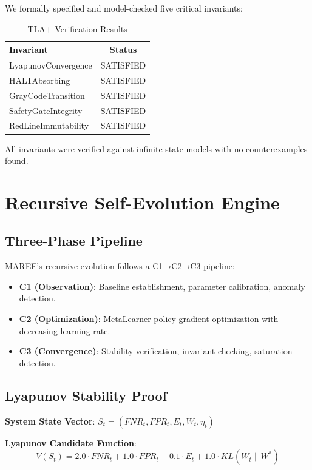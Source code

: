 \documentclass[11pt,a4paper]{article}
\begin{document}
We formally specified and model-checked five critical invariants:

\begin{table}[ht]
\centering
\caption{TLA+ Verification Results}
\label{tab:tla}
\begin{tabular}{lc}
\toprule
Invariant & Status \\
\midrule
LyapunovConvergence & SATISFIED \\
HALTAbsorbing & SATISFIED \\
GrayCodeTransition & SATISFIED \\
SafetyGateIntegrity & SATISFIED \\
RedLineImmutability & SATISFIED \\
\bottomrule
\end{tabular}
\end{table}

All invariants were verified against infinite-state models with no counterexamples found.

\section{Recursive Self-Evolution Engine}
\label{sec:recursive}

\subsection{Three-Phase Pipeline}

MAREF's recursive evolution follows a C1→C2→C3 pipeline:

\begin{itemize}
  \item \textbf{C1 (Observation)}: Baseline establishment, parameter calibration, anomaly detection.
  \item \textbf{C2 (Optimization)}: MetaLearner policy gradient optimization with decreasing learning rate.
  \item \textbf{C3 (Convergence)}: Stability verification, invariant checking, saturation detection.
\end{itemize}

\subsection{Lyapunov Stability Proof}

\textbf{System State Vector}: $S_t = (FNR_t, FPR_t, E_t, W_t, \eta_t)$

\textbf{Lyapunov Candidate Function}:
\[
V(S_t) = 2.0 \cdot FNR_t + 1.0 \cdot FPR_t + 0.1 \cdot E_t + 1.0 \cdot KL(W_t \parallel W^*)
\]
\end{document}
